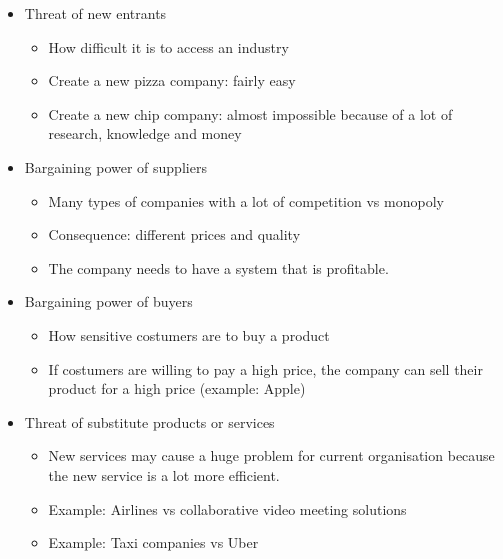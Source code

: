 \documentclass{article}
\begin{document}
\begin{itemize}
\item  Threat of new entrants

\begin{itemize}
\item  How difficult it is to access an industry

\item  Create a new pizza company: fairly easy

\item  Create a new chip company: almost impossible because of a lot of research, knowledge and money
\end{itemize}

\item  Bargaining power of suppliers

\begin{itemize}
\item  Many types of companies with a lot of competition vs monopoly

\item  Consequence: different prices and quality

\item  The company needs to have a system that is profitable.
\end{itemize}

\item  Bargaining power of buyers

\begin{itemize}
\item  How sensitive costumers are to buy a product

\item  If costumers are willing to pay a high price, the company can sell their product for a high price (example: Apple)
\end{itemize}

\item  Threat of substitute products or services

\begin{itemize}
\item  New services may cause a huge problem for current organisation because the new service is a lot more efficient.

\item  Example: Airlines vs collaborative video meeting solutions

\item  Example: Taxi companies vs Uber
\end{itemize}


\end{itemize}
\end{document}
